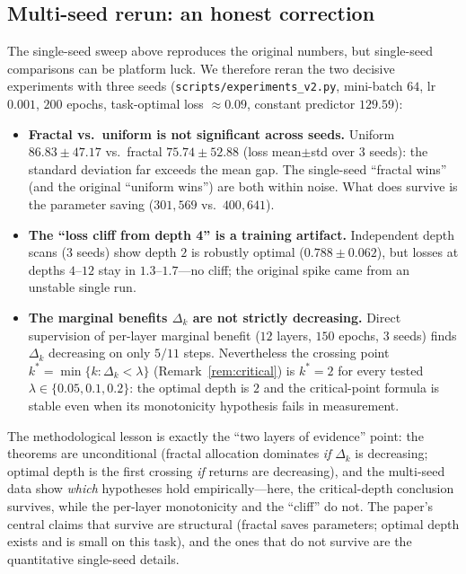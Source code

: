 \documentclass[journal]{IEEEtran}
\begin{document}
\subsection{Multi-seed rerun: an honest correction}
\label{sec:multiseed}
The single-seed sweep above reproduces the original numbers, but single-seed
comparisons can be platform luck. We therefore reran the two decisive
experiments with three seeds
(\texttt{scripts/experiments\_v2.py}, mini-batch $64$, lr $0.001$,
$200$ epochs, task-optimal loss ${\approx}0.09$, constant predictor
$129.59$):
\begin{itemize}
\item \textbf{Fractal vs.\ uniform is not significant across seeds.} Uniform
$86.83\pm47.17$ vs.\ fractal $75.74\pm52.88$ (loss mean$\pm$std over 3 seeds):
the standard deviation far exceeds the mean gap. The single-seed ``fractal
wins'' (and the original ``uniform wins'') are both within noise. What does
survive is the parameter saving ($301{,}569$ vs.\ $400{,}641$).
\item \textbf{The ``loss cliff from depth 4'' is a training artifact.}
Independent depth scans (3 seeds) show depth $2$ is robustly optimal
($0.788\pm0.062$), but losses at depths $4$--$12$ stay in $1.3$--$1.7$---no
cliff; the original spike came from an unstable single run.
\item \textbf{The marginal benefits $\Delta_k$ are not strictly decreasing.}
Direct supervision of per-layer marginal benefit ($12$ layers, $150$ epochs,
3 seeds) finds $\Delta_k$ decreasing on only $5/11$ steps. Nevertheless the
crossing point $k^*=\min\{k:\Delta_k<\lambda\}$ (Remark~\ref{rem:critical})
is $k^*=2$ for every tested $\lambda\in\{0.05,0.1,0.2\}$: the optimal depth
is $2$ and the critical-point formula is stable even when its monotonicity
hypothesis fails in measurement.
\end{itemize}
The methodological lesson is exactly the ``two layers of evidence'' point:
the theorems are unconditional (fractal allocation dominates \emph{if}
$\Delta_k$ is decreasing; optimal depth is the first crossing \emph{if}
returns are decreasing), and the multi-seed data show \emph{which} hypotheses
hold empirically---here, the critical-depth conclusion survives, while the
per-layer monotonicity and the ``cliff'' do not. The paper's central claims
that survive are structural (fractal saves parameters; optimal depth exists
and is small on this task), and the ones that do not survive are the
quantitative single-seed details.
\end{document}
